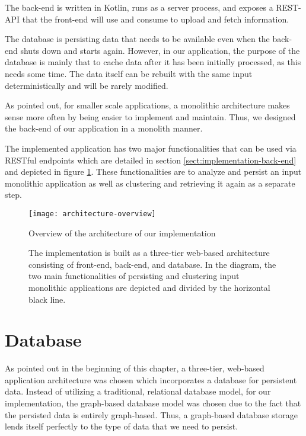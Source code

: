 \documentclass[12pt,a4paper]{report}
\begin{document}
The back-end is written in Kotlin, runs as a server process, and exposes
a REST-API that the front-end will use and consume to upload and fetch information.

The database is persisting data that needs to be available even when the
back-end shuts down and starts again. However, in our application,
the purpose of the database is mainly that to cache data after it has
been initially processed, as this needs some time. The data itself can be
rebuilt with the same input deterministically and will be rarely modified.

As pointed out, for smaller scale applications, a monolithic architecture
makes sense more often by being easier to implement and maintain.
Thus, we designed the back-end of our application in a monolith manner.

The implemented application has two major functionalities that can be used
via RESTful endpoints which are detailed in section \ref{sect:implementation-back-end}
and depicted in figure \ref{fig:architecture-overview}.
These functionalities are to analyze and persist an input monolithic application
as well as clustering and retrieving it again as a separate step.

\begin{figure}[htbp]
\centering
\texttt{[image: architecture-overview]}
\caption{Overview of the architecture of our implementation}
\caption*{\centering
    The implementation is built as a three-tier web-based architecture consisting of
    front-end, back-end, and database. In the diagram, the two main functionalities of
    persisting and clustering input monolithic applications are depicted and
    divided by the horizontal black line.
}
\label{fig:architecture-overview}
\end{figure}



\section{Database} \label{sect:implementation-database}

As pointed out in the beginning of this chapter, a three-tier, web-based
application architecture was chosen which incorporates a database
for persistent data.
Instead of utilizing a traditional, relational database model,
for our implementation, the graph-based database model was chosen
due to the fact that the persisted data is entirely graph-based.
Thus, a graph-based database storage lends itself perfectly to the
type of data that we need to persist.
\end{document}
